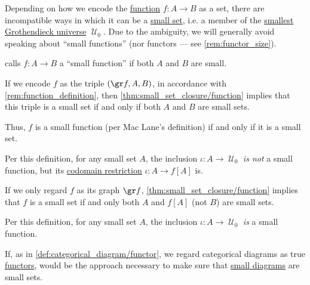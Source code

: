 \begin{remark}\label{rem:function_size}
  Depending on how we encode the \hyperref[def:function]{function} \( f: A \to B \) as a set, there are incompatible ways in which it can be a \hyperref[def:small_set]{small set}, i.e. a member of the \hyperref[def:smallest_grothendieck_universe]{smallest Grothendieck universe} \( \mscrU_0 \). Due to the ambiguity, we will generally avoid speaking about \enquote{small functions} (nor functors --- see \cref{rem:functor_size}).

  \begin{thmenum}
     \Textcite[22]{MacLane1998CategoryTheory} calls \( f: A \to B \) a \enquote{small function} if both \( A \) and \( B \) are small.

    If we encode \( f \) as the triple \( (\gr f, A, B) \), in accordance with \cref{rem:function_definition}, then \cref{thm:small_set_closure/function} implies that this triple is a small set if and only if both \( A \) and \( B \) are small sets.

    Thus, \( f \) is a small function (per Mac Lane's definition) if and only if it is a small set.

    Per this definition, for any small set \( A \), the inclusion \( \iota: A \to \mscrU_0 \) \emph{is not} a small function, but its \hyperref[def:set_valued_function/restriction]{codomain restriction} \( \iota: A \to f[A] \) is.

     If we only regard \( f \) as its graph \( \gr f \), \cref{thm:small_set_closure/function} implies that \( f \) is a small set if and only both \( A \) and \( f[A] \) (not \( B \)) are small sets.

    Per this definition, for any small set \( A \), the inclusion \( \iota: A \to \mscrU_0 \) \emph{is} a small function.

    If, as in \cref{def:categorical_diagram/functor}, we regard categorical diagrams as true \hyperref[def:functor]{functors}, would be the approach necessary to make sure that \hyperref[def:categorical_diagram/small]{small diagrams} are small sets.
  \end{thmenum}
\end{remark}

